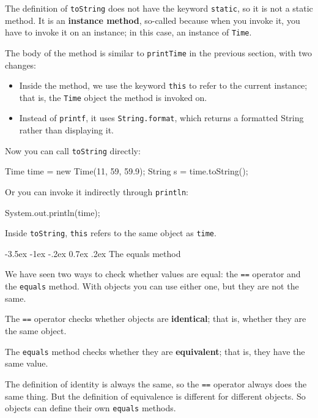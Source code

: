\documentclass[12pt]{book}
\makeatletter
\theoremstyle{exercise}
\newcommand{\java}[1]{\verb"#1"}
\renewcommand{\section}{\@startsection{section}{1}{\z@}%
    {-3.5ex \@plus -1ex \@minus -.2ex}%
    {0.7ex \@plus.2ex}%
    {\normalfont\Large\bfseries}}
\newcommand{\java}[1]{\lstinline{#1}} %
\makeatother
\begin{document}
The definition of \java{toString} does not have the keyword \java{static}, so it is not a static method.
It is an {\bf instance method}, so-called because when you invoke it, you have to invoke it on an instance; in this case, an instance of \java{Time}.

The body of the method is similar to \java{printTime} in the previous section, with two changes:

\begin{itemize}

\item Inside the method, we use the keyword \java{this} to refer to the current instance; that is, the \java{Time} object the method is invoked on.

\item Instead of \java{printf}, it uses \java{String.format}, which returns a formatted String rather than displaying it.

\end{itemize}

Now you can call \java{toString} directly:

\begin{code}
    Time time = new Time(11, 59, 59.9);
    String s = time.toString();
\end{code}

Or you can invoke it indirectly through \java{println}:

\begin{code}
    System.out.println(time);
\end{code}

Inside \java{toString}, \java{this} refers to the same object as \java{time}.


\section{The equals method}


We have seen two ways to check whether values are equal: the \java{==} operator and the \java{equals} method.
With objects you can use either one, but they are not the same.

The \java{==} operator checks whether objects are {\bf identical}; that is, whether they are the same object.

The \java{equals} method checks whether they are {\bf equivalent}; that is, they have the same value.

The definition of identity is always the same, so the \java{==} operator always does the same thing.
But the definition of equivalence is different for different objects.
So objects can define their own \java{equals} methods.
\end{document}
